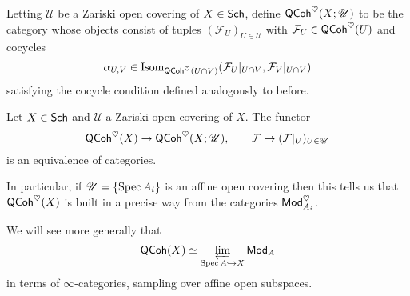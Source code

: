 \documentclass[11pt]{article}
\newcommand{\FF}{\mathcal{F}}
\newcommand{\UU}{\mathscr{U}}
\begin{document}
Letting $\UU$ be a Zariski open covering of $X\in\operatorname{\mathsf{Sch}}$, define $\QCoh^{\heart}(X;\UU)$ to be the category whose objects consist of tuples $(\FF_U)_{U\in\UU}$ with $\FF_U\in\QCoh^{\heart}(U)$ and cocycles 
$$\alpha_{U,V}\in\Isom_{\QCoh^{\heart}(U\cap V)}(\FF_U|_{U\cap V},\FF_V|_{U\cap V})$$
satisfying the cocycle condition defined analogously to before.

\begin{theorem}[Serre]
Let $X\in\operatorname{\mathsf{Sch}}$ and $\UU$ a Zariski open covering of $X$. The functor
$$\QCoh^{\heart}(X)\to\QCoh^{\heart}(X;\UU),\qquad \FF\mapsto(\FF|_U)_{U\in\UU}$$
is an equivalence of categories.
\end{theorem}

In particular, if $\UU=\{\Spec A_i\}$ is an affine open covering then this tells us that $\operatorname{\mathsf{QCoh}}^{\heartsuit}(X)$ is built in a precise way from the categories $\operatorname{\mathsf{Mod}}_{A_i}^{\heartsuit}$.

\begin{remark}
We will see more generally that 
$$\operatorname{\mathsf{QCoh}}(X)\simeq\displaystyle\varprojlim_{\operatorname{Spec} A\hookrightarrow X}\operatorname{\mathsf{Mod}}_A$$ 
in terms of $\infty$-categories, sampling over affine open subspaces.
\end{remark}
\end{document}

